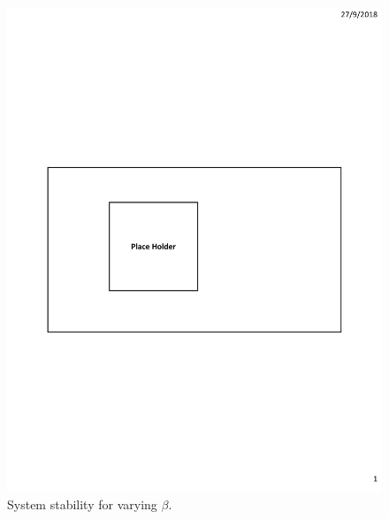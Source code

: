 \begin{figure}[h]
\begin{minipage}{0.18\linewidth}
		\includegraphics[width=\linewidth]{fig/PlaceHolder.pdf}
		\centerline{\dsrandom}
	\end{minipage}
	\caption{System stability for varying $\beta$.}
	\label{fig:vary-beta-stability}
\end{figure}


